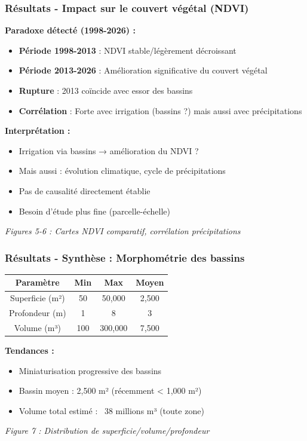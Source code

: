 \documentclass{beamer}
\begin{document}
\begin{frame}
\frametitle{Résultats - Impact sur le couvert végétal (NDVI)}
\textbf{Paradoxe détecté (1998-2026) :}
\begin{itemize}
  \item \textbf{Période 1998-2013} : NDVI stable/légèrement décroissant
  \item \textbf{Période 2013-2026} : Amélioration significative du couvert végétal
  \item \textbf{Rupture} : 2013 coïncide avec essor des bassins
  \item \textbf{Corrélation} : Forte avec irrigation (bassins ?) mais aussi avec précipitations
\end{itemize}

\textbf{Interprétation :}
\begin{itemize}
  \item Irrigation via bassins → amélioration du NDVI ?
  \item Mais aussi : évolution climatique, cycle de précipitations
  \item Pas de causalité directement établie
  \item Besoin d'étude plus fine (parcelle-échelle)
\end{itemize}

\begin{center}
  \small{\textit{Figures 5-6 : Cartes NDVI comparatif, corrélation précipitations}}
\end{center}
\end{frame}

\begin{frame}
\frametitle{Résultats - Synthèse : Morphométrie des bassins}
\begin{center}
  \small{
  \begin{tabular}{|c|c|c|c|}
    \hline
    \textbf{Paramètre} & \textbf{Min} & \textbf{Max} & \textbf{Moyen} \\
    \hline
    Superficie (m²) & 50 & 50,000 & 2,500 \\
    Profondeur (m) & 1 & 8 & 3 \\
    Volume (m³) & 100 & 300,000 & 7,500 \\
    \hline
  \end{tabular}
  }
\end{center}

\textbf{Tendances :}
\begin{itemize}
  \item Miniaturisation progressive des bassins
  \item Bassin moyen : 2,500 m² (récemment < 1,000 m²)
  \item Volume total estimé : ~38 millions m³ (toute zone)
\end{itemize}

\begin{center}
  \small{\textit{Figure 7 : Distribution de superficie/volume/profondeur}}
\end{center}
\end{frame}
\end{document}

